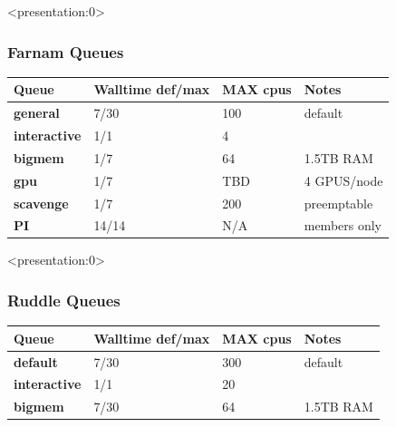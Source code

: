 \documentclass[10pt]{beamer}
\begin{document}
\begin{frame}<presentation:0>

\frametitle{Farnam Queues}

\begin{tabular}{|l|l|l|l|}
\hline
\textbf{Queue} & \textbf{Walltime def/max}& \textbf{MAX cpus} & \textbf{Notes} \\
\hline
\textbf{general} & 7/30 &  100 & default \\
\hline
\textbf{interactive} & 1/1 & 4 &  \\
\hline
\textbf{bigmem} & 1/7 & 64 & 1.5TB RAM \\
\hline
\textbf{gpu} & 1/7 & TBD & 4 GPUS/node \\
\hline
\textbf{scavenge} & 1/7 & 200 & preemptable \\
\hline
\textbf{PI} & 14/14 & N/A & members only \\
\hline
\end{tabular}

\end{frame}

\begin{frame}<presentation:0>
\frametitle{Ruddle Queues}

\begin{tabular}{|l|l|l|l|}
\hline
\textbf{Queue} & \textbf{Walltime def/max}& \textbf{MAX cpus} & \textbf{Notes} \\
\hline
\textbf{default} & 7/30 &  300 & default \\
\hline
\textbf{interactive} & 1/1 & 20 &  \\
\hline
\textbf{bigmem} & 7/30 & 64 & 1.5TB RAM \\
\hline
\end{tabular}

\end{frame}
\end{document}
